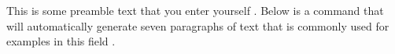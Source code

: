 \documentclass{article}
\begin{document}
This is some preamble text that you enter yourself .
Below is a command that will automatically generate seven paragraphs
of text that is commonly used for examples in this field .
\lipsum[1-7]
\end{document}
